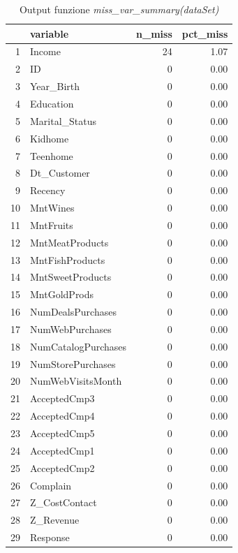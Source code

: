 \documentclass[letterpaper,11pt]{article}
\begin{document}
\begin{table}[H]
\centering
\begin{tabular}{rlrr}
  \hline
 & variable & n\_miss & pct\_miss \\ 
  \hline
1 & Income &  24 & 1.07 \\ 
  2 & ID &   0 & 0.00 \\ 
  3 & Year\_Birth &   0 & 0.00 \\ 
  4 & Education &   0 & 0.00 \\ 
  5 & Marital\_Status &   0 & 0.00 \\ 
  6 & Kidhome &   0 & 0.00 \\ 
  7 & Teenhome &   0 & 0.00 \\ 
  8 & Dt\_Customer &   0 & 0.00 \\ 
  9 & Recency &   0 & 0.00 \\ 
  10 & MntWines &   0 & 0.00 \\ 
  11 & MntFruits &   0 & 0.00 \\ 
  12 & MntMeatProducts &   0 & 0.00 \\ 
  13 & MntFishProducts &   0 & 0.00 \\ 
  14 & MntSweetProducts &   0 & 0.00 \\ 
  15 & MntGoldProds &   0 & 0.00 \\ 
  16 & NumDealsPurchases &   0 & 0.00 \\ 
  17 & NumWebPurchases &   0 & 0.00 \\ 
  18 & NumCatalogPurchases &   0 & 0.00 \\ 
  19 & NumStorePurchases &   0 & 0.00 \\ 
  20 & NumWebVisitsMonth &   0 & 0.00 \\ 
  21 & AcceptedCmp3 &   0 & 0.00 \\ 
  22 & AcceptedCmp4 &   0 & 0.00 \\ 
  23 & AcceptedCmp5 &   0 & 0.00 \\ 
  24 & AcceptedCmp1 &   0 & 0.00 \\ 
  25 & AcceptedCmp2 &   0 & 0.00 \\ 
  26 & Complain &   0 & 0.00 \\ 
  27 & Z\_CostContact &   0 & 0.00 \\ 
  28 & Z\_Revenue &   0 & 0.00 \\ 
  29 & Response &   0 & 0.00 \\ 
   \hline
\end{tabular}

    \caption{Output funzione \textit{miss\_var\_summary(dataSet)}}
   
   \label{fig:miss_var_summary(dataSet)}
\end{table}
\end{document}
